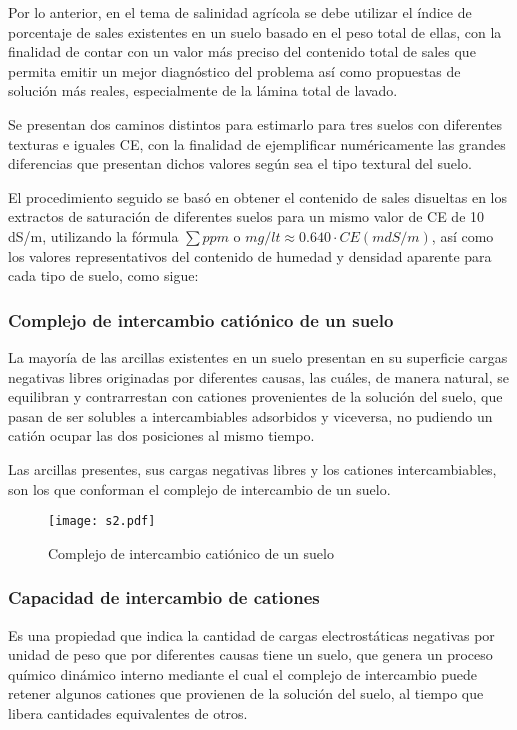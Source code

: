 Por lo anterior, en el tema de salinidad agrícola se debe utilizar el índice de porcentaje de sales existentes en un suelo basado en el peso total de ellas, con la finalidad de contar con un valor más preciso del contenido total de sales que permita emitir un mejor diagnóstico del problema así como propuestas de solución más reales, especialmente de la lámina total de lavado.

Se presentan dos caminos distintos para estimarlo para tres suelos con diferentes texturas e iguales CE, con la finalidad de ejemplificar numéricamente las grandes diferencias que presentan dichos valores según sea el tipo textural del suelo.

El procedimiento seguido se basó en obtener el contenido de sales disueltas en los extractos de saturación de diferentes suelos para un mismo valor de CE de 10 dS/m, utilizando la fórmula $\sum ppm$ o $mg/lt \approx 0.640 \cdot CE (mdS/m)$, así como los valores representativos del contenido de humedad y densidad aparente para cada tipo de suelo, como sigue:
\subsubsection{Complejo de intercambio catiónico de un suelo}
La mayoría de las arcillas existentes en un suelo presentan en su superficie cargas negativas libres originadas por diferentes causas, las cuáles, de manera natural, se equilibran y contrarrestan con cationes provenientes de la solución del suelo, que pasan de ser solubles a intercambiables adsorbidos y viceversa, no pudiendo un catión ocupar las dos posiciones al mismo tiempo.

Las arcillas presentes, sus cargas negativas libres y los cationes intercambiables, son los que conforman el complejo de intercambio de un suelo.
\begin{figure}[h!]
\centering
\texttt{[image: s2.pdf]}
\caption{Complejo de intercambio catiónico de un suelo}
\label{s2}
\end{figure}

\subsubsection{Capacidad de intercambio de cationes}
Es una propiedad que indica la cantidad de cargas electrostáticas negativas por unidad de peso que por diferentes causas tiene un suelo, que genera un proceso químico dinámico interno mediante el cual el complejo de intercambio puede retener algunos cationes que provienen de la solución del suelo, al tiempo que libera cantidades equivalentes de otros.

